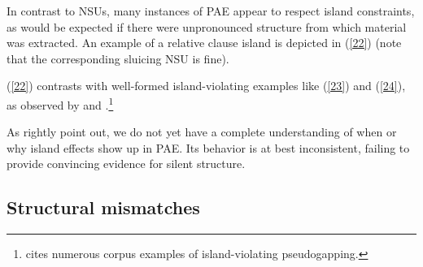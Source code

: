 {In contrast to NSUs, many instances of PAE appear to respect island constraints, as would be expected if there were unpronounced structure from which material was extracted. An example of a relative clause island is depicted in (\ref{22}) (note that the corresponding sluicing NSU  is fine).


\z
(\ref{22}) contrasts with well-formed island-violating examples like (\ref{23}) and (\ref{24}), as observed by \citet[]{Miller2014} and \citet[]{Ginzburg2018}.\footnote{\citet{Miller2014} cites numerous corpus examples of island-violating pseudogapping.}
%
%
\eal
{}

\zl
%

As \citet{Ginzburg2018} rightly point out, we do not yet have a complete understanding of when or why island effects show up in PAE. Its behavior is at best inconsistent, failing to provide convincing evidence for silent structure.


\subsection{Structural mismatches}
\label{sec-structural-mismatches}

}
